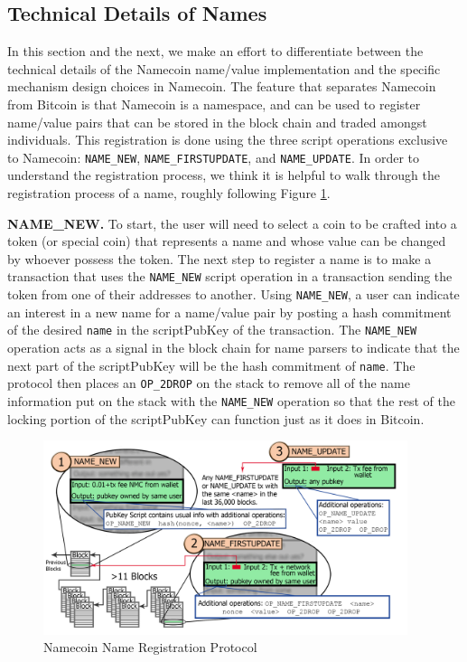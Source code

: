 \subsection{Technical Details of Names}

In this section and the next, we make an effort to differentiate between the technical details of the Namecoin name/value implementation and the specific mechanism design choices in Namecoin. The feature that separates Namecoin from Bitcoin is that Namecoin is a namespace, and can be used to register name/value pairs that can be stored in the block chain and traded amongst individuals. This registration is done using the three script operations exclusive to Namecoin: {\tt NAME\_NEW}, {\tt NAME\_FIRSTUPDATE}, and {\tt NAME\_UPDATE}. In order to understand the registration process, we think it is helpful to walk through the registration process of a name, roughly following Figure \ref{fig:registration}. 

{\bf NAME\_NEW.}
To start, the user will need to select a coin to be crafted into a token (or special coin) that represents a name and whose value can be changed by whoever possess the token. The next step to register a name is to make a transaction that uses the {\tt NAME\_NEW} script operation in a transaction sending the token from one of their addresses to another. Using {\tt NAME\_NEW}, a user can indicate an interest in a new name for a name/value pair by posting a hash commitment of the desired {\tt name} in the scriptPubKey of the transaction. The {\tt NAME\_NEW} operation acts as a signal in the block chain for name parsers to indicate that the next part of the scriptPubKey will be the hash commitment of {\tt name}. The protocol then places an {\tt OP\_2DROP} on the stack to remove all of the name information put on the stack with the {\tt NAME\_NEW} operation so that the rest of the locking portion of the scriptPubKey can function just as it does in Bitcoin. 

\begin{figure}
  \centering
  \includegraphics[width=0.95\textwidth]{registration.png}
  \caption{Namecoin Name Registration Protocol}
  \label{fig:registration}
\end{figure}


